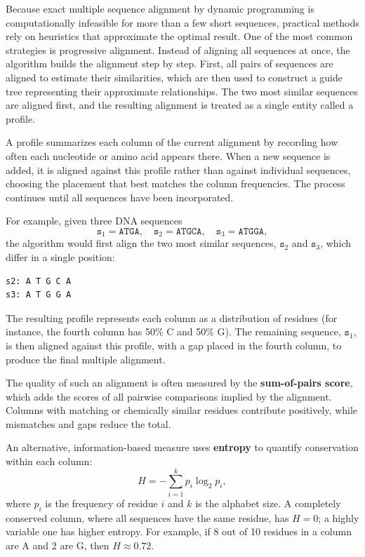 Because exact multiple sequence alignment by dynamic programming is computationally infeasible for more than a few short sequences, practical methods rely on heuristics that approximate the optimal result. One of the most common strategies is progressive alignment. Instead of aligning all sequences at once, the algorithm builds the alignment step by step. First, all pairs of sequences are aligned to estimate their similarities, which are then used to construct a guide tree 
representing their approximate relationships. The two most similar sequences are aligned first, and the resulting alignment is treated as a single entity called a profile.  

A profile summarizes each column of the current alignment by recording how often each nucleotide or amino acid appears there. When a new sequence is added, it is aligned against this profile rather than against individual sequences, choosing the placement that best matches the column frequencies. The process continues until all sequences have been incorporated.  

For example, given three DNA sequences  
\[
\texttt{s}_1 = \texttt{ATGA}, \quad 
\texttt{s}_2 = \texttt{ATGCA}, \quad 
\texttt{s}_3 = \texttt{ATGGA},
\]
the algorithm would first align the two most similar sequences, $\texttt{s}_2$ and $\texttt{s}_3$, which differ in a single position:
\begin{verbatim}
s2: A T G C A
s3: A T G G A
\end{verbatim}
The resulting profile represents each column as a distribution of residues (for instance, the fourth column has 50\% C and 50\% G). The remaining sequence, $\texttt{s}_1$, is then aligned against this profile, with a gap placed in the fourth column, to produce the final multiple alignment.

The quality of such an alignment is often measured by the \textbf{sum-of-pairs score}, which adds the scores of all pairwise comparisons implied by the alignment. Columns with matching or chemically similar residues contribute positively, while mismatches and gaps reduce the total.  

An alternative, information-based measure uses \textbf{entropy} to quantify conservation within each column:
\[
H = -\sum_{i=1}^{k} p_i \log_2 p_i,
\]
where $p_i$ is the frequency of residue $i$ and $k$ is the alphabet size. A completely conserved column, where all sequences have the same residue, has $H = 0$; a highly variable one has higher entropy. For example, if 8 out of 10 residues in a column are A and 2 are G, then $H \approx 0.72$.  

